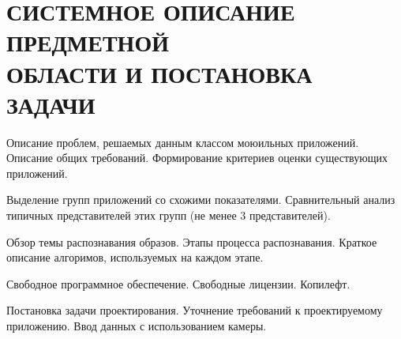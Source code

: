\section[Системное описание предметной области и постановка задачи]{%
  СИСТЕМНОЕ ОПИСАНИЕ ПРЕДМЕТНОЙ \\
  ОБЛАСТИ И ПОСТАНОВКА ЗАДАЧИ
}

Описание проблем, решаемых данным классом моюильных приложений.
Описание общих требований.
Формирование критериев оценки существующих приложений.

Выделение групп приложений со схожими показателями. Сравнительный анализ типичных представителей этих групп (не менее 3 представителей).

Обзор темы распознавания образов.
Этапы процесса распознавания.
Краткое описание алгоримов, используемых на каждом этапе.

Свободное программное обеспечение. Свободные лицензии. Копилефт.

Постановка задачи проектирования.
Уточнение требований к проектируемому приложению. Ввод данных с использованием камеры.